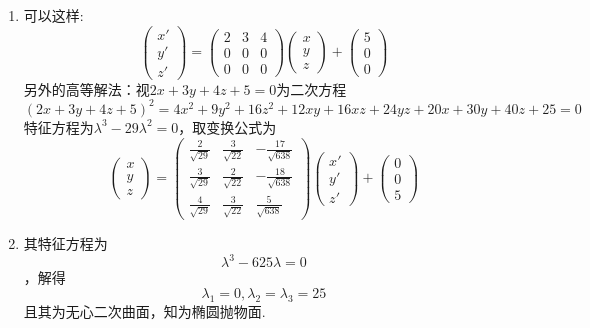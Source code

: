 \documentclass[UTF8]{ctexart}
\begin{document}
\begin{enumerate}
\item 可以这样:
$$\left(\begin{array}{c}x'\\y'\\z'\end{array}\right)=\left(\begin{array}{ccc}2&3&4\\0&0&0\\0&0&0\end{array}\right)\left(\begin{array}{c}x\\y\\z\end{array}\right)+\left(\begin{array}{c}5\\0\\0\end{array}\right)$$
另外的高等解法：视$2x+3y+4z+5=0$为二次方程
$$\left(2x+3y+4z+5\right)^2=4x^2+9y^2+16z^2+12xy+16xz+24yz+20x+30y+40z+25=0$$
特征方程为$\lambda^3-29\lambda^2=0$，取变换公式为
$$\left(\begin{array}{c}x\\y\\z\end{array}\right)=\left(\begin{array}{ccc}\displaystyle\frac{2}{\sqrt{29}}&\displaystyle\frac{3}{\sqrt{22}}&\displaystyle-\frac{17}{\sqrt{638}}\\\displaystyle\frac{3}{\sqrt{29}}&\displaystyle\frac{2}{\sqrt{22}}&-\displaystyle\frac{18}{\sqrt{638}}\\\displaystyle\frac{4}{\sqrt{29}}&\displaystyle\frac{3}{\sqrt{22}}&\displaystyle\frac{5}{\sqrt{638}}\end{array}\right)\left(\begin{array}{c}x'\\y'\\z'\end{array}\right)+\left(\begin{array}{c}0\\0\\5\end{array}\right)$$

\item 其特征方程为$$\lambda^3-625\lambda=0$$，解得$$\lambda_1=0,\lambda_2=\lambda_3=25$$且其为无心二次曲面，知为椭圆抛物面. 


\end{enumerate}
\end{document}
